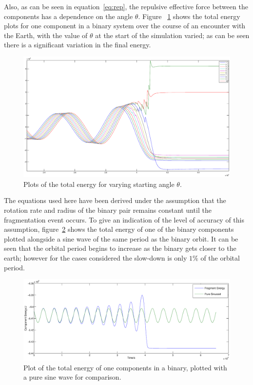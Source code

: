 \documentclass[letterpaper, preprint, paper,11pt]{AAS}	%
\begin{document}
Also, as can be seen in equation~\ref{eq:rep}, the repulsive effective force between the components has a dependence on the angle $\theta$. Figure ~\ref{fig:phase} shows the total energy plots for one component in a binary system over the course of an encounter with the Earth, with the value of $\theta$ at the start of the simulation varied; as can be seen there is a significant variation in the final energy. 
 \begin{figure}[H]
\centering
\includegraphics[width=\textwidth]{phasing_2.eps} 
\caption{Plots of the total energy for varying starting angle $\theta$.} 
\label{fig:phase}
\end{figure} 

The equations used here have been derived under the assumption that the rotation rate and radius of the binary pair remains constant until the fragmentation event occurs. To give an indication of the level of accuracy of this assumption, figure~\ref{fig:sin} shows the total energy of one of the binary components plotted alongside a sine wave of the same period as the binary orbit. It can be seen that the orbital period begins to increase as the binary gets closer to the earth; however for the cases considered the slow-down is only $1\%$ of the orbital period. 
\begin{figure}[H]
\centering
\includegraphics[width=\textwidth]{pure_sin.eps} 
\caption{Plot of the total energy of one components in a binary, plotted with a pure sine wave for comparison.} 
\label{fig:sin}
\end{figure}
\end{document}
